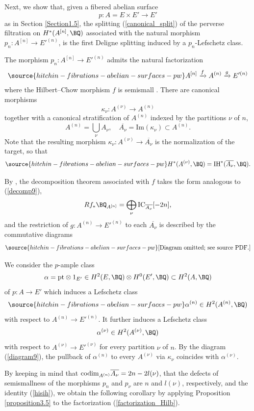 {Next, we show that, given a fibered abelian surface
\[p:A=E\times E' \to E'\]
  as in Section \ref{Section1.5},
the splitting (\ref{canonical_split}) of the perverse filtration on $H^*(A^{[n]}, \BQ)$ associated with the natural morphism  $p_n: A^{[n]} \to E'^{(n)}$,
 is the first Deligne splitting induced by a  $p_n$-Lefschetz class.

The morphism $p_n: A^{[n]} \to E'^{(n)}$ admits the natural factorization
\begin{equation}\label{factorization_Hilb}
\source{hitchin-fibrations-abelian-surfaces-pw}
A^{[n]} \xrightarrow{f} A^{(n)} \xrightarrow{g} E'^{(n)}
\end{equation}
where the Hilbert--Chow morphism $f$ is semismall \cite{Go2}. There are canonical morphisms
\[
\kappa_\nu: A^{(\nu)} \to A^{(n)}
\]
together with a canonical stratification of $A^{(n)}$ indexed by the partitions $\nu$ of $n$,
\[
A^{(n)} = \bigcup_\nu A_\nu, \quad \overline{A_\nu} = \mathrm{Im}(\kappa_\nu) \subset A^{(n)}.
\]
Note that  the resulting morphism $\kappa_\nu:A^{(\nu)} \to \overline{A_\nu}$ is the normalization of the target,
so that
\begin{equation}\label{hisih}
\source{hitchin-fibrations-abelian-surfaces-pw}
H^*(A^{(\nu)},\BQ)= {\rm IH}^*(\overline{A_\nu},\BQ).
\end{equation}

By \cite[Theorem 3]{Go2}, the decomposition theorem associated with $f$ takes the form
analogous to (\ref{decomp9}),
\[
Rf_* \BQ_{A^{[n]}} = \bigoplus_{\nu} \mathrm{IC}_{\overline{A_\nu}} [-2n],
\]
and the restriction of $g: A^{(n)} \to E'^{(n)}$ to each $\overline{A_\nu}$ is described by the commutative diagrams
\begin{equation}\label{diagram9}
\source{hitchin-fibrations-abelian-surfaces-pw}
\text{[Diagram omitted; see source PDF.]}
\end{equation}

We consider the $p$-ample class
\[
\alpha = \mathrm{pt} \otimes 1_{E'} \in H^2(E, \BQ)\otimes H^0(E', \BQ) \subset H^2(A, \BQ)
\]
of $p:A \to E'$ which induces a Lefschetz class
\begin{equation}\label{alpha(n)}
\source{hitchin-fibrations-abelian-surfaces-pw}
\alpha^{(n)} \in H^2(A^{(n)}, \BQ)
\end{equation}
with respect to $A^{(n)} \to E'^{(n)}$. It further induces a Lefschetz class
\[
\alpha^{(\nu)} \in H^2(A^{(\nu)}, \BQ)
\]
with respect to $A^{(\nu)} \to E'^{(\nu)}$ for every partition $\nu$ of $n$. By the diagram (\ref{diagram9}), the pullback of $\alpha^{(n)}$ to every $A^{(\nu)}$ via $\kappa_\nu$ coincides with $\alpha^{(\nu)}$.

By keeping in mind that  ${\rm codim}_{A^{(n)}} \overline{A_\nu}=2n -2l(\nu)$, that the defects of semismallness of the morphisms  $p_n$ and $p_\nu$ are $n$ and $l(\nu)$, respectively, and the identity (\ref{hisih}),
we obtain the following corollary by applying Proposition \ref{proposition3.5} to the factorization (\ref{factorization_Hilb}).
}

